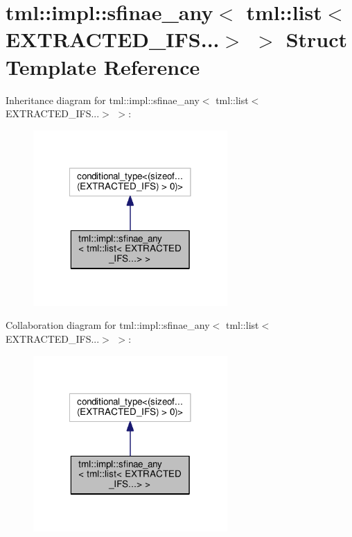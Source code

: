 \hypertarget{structtml_1_1impl_1_1sfinae__any_3_01tml_1_1list_3_01_e_x_t_r_a_c_t_e_d___i_f_s_8_8_8_4_01_4}{\section{tml\+:\+:impl\+:\+:sfinae\+\_\+any$<$ tml\+:\+:list$<$ E\+X\+T\+R\+A\+C\+T\+E\+D\+\_\+\+I\+F\+S...$>$ $>$ Struct Template Reference}
\label{structtml_1_1impl_1_1sfinae__any_3_01tml_1_1list_3_01_e_x_t_r_a_c_t_e_d___i_f_s_8_8_8_4_01_4}
}


Inheritance diagram for tml\+:\+:impl\+:\+:sfinae\+\_\+any$<$ tml\+:\+:list$<$ E\+X\+T\+R\+A\+C\+T\+E\+D\+\_\+\+I\+F\+S...$>$ $>$\+:
\nopagebreak
\begin{figure}[H]
\begin{center}
\leavevmode
\includegraphics[width=210pt]{structtml_1_1impl_1_1sfinae__any_3_01tml_1_1list_3_01_e_x_t_r_a_c_t_e_d___i_f_s_8_8_8_4_01_4__inherit__graph}
\end{center}
\end{figure}


Collaboration diagram for tml\+:\+:impl\+:\+:sfinae\+\_\+any$<$ tml\+:\+:list$<$ E\+X\+T\+R\+A\+C\+T\+E\+D\+\_\+\+I\+F\+S...$>$ $>$\+:
\nopagebreak
\begin{figure}[H]
\begin{center}
\leavevmode
\includegraphics[width=210pt]{structtml_1_1impl_1_1sfinae__any_3_01tml_1_1list_3_01_e_x_t_r_a_c_t_e_d___i_f_s_8_8_8_4_01_4__coll__graph}
\end{center}
\end{figure}


